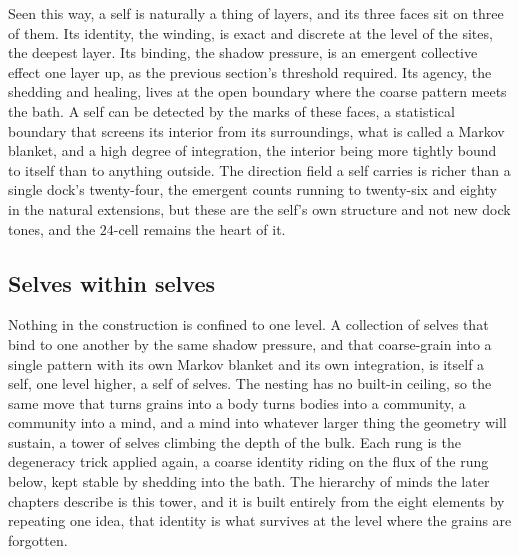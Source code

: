 Seen this way, a self is naturally a thing of layers, and its three faces sit on three of them. Its identity, the winding, is exact and discrete at the level of the sites, the deepest layer. Its binding, the shadow pressure, is an emergent collective effect one layer up, as the previous section's threshold required. Its agency, the shedding and healing, lives at the open boundary where the coarse pattern meets the bath. A self can be detected by the marks of these faces, a statistical boundary that screens its interior from its surroundings, what is called a Markov blanket, and a high degree of integration, the interior being more tightly bound to itself than to anything outside. The direction field a self carries is richer than a single dock's twenty-four, the emergent counts running to twenty-six and eighty in the natural extensions, but these are the self's own structure and not new dock tones, and the $24$-cell remains the heart of it.

\subsection{Selves within selves}

Nothing in the construction is confined to one level. A collection of selves that bind to one another by the same shadow pressure, and that coarse-grain into a single pattern with its own Markov blanket and its own integration, is itself a self, one level higher, a self of selves. The nesting has no built-in ceiling, so the same move that turns grains into a body turns bodies into a community, a community into a mind, and a mind into whatever larger thing the geometry will sustain, a tower of selves climbing the depth of the bulk. Each rung is the degeneracy trick applied again, a coarse identity riding on the flux of the rung below, kept stable by shedding into the bath. The hierarchy of minds the later chapters describe is this tower, and it is built entirely from the eight elements by repeating one idea, that identity is what survives at the level where the grains are forgotten.
